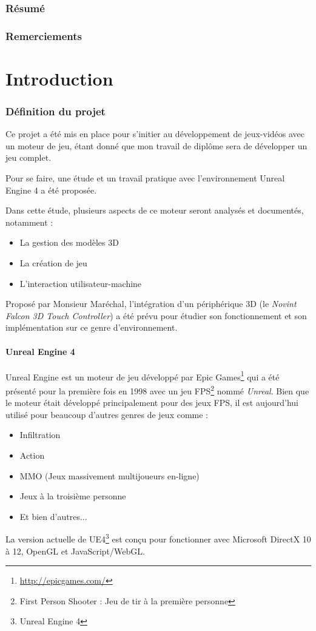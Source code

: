 \documentclass[11pt, a4paper, oneside]{article}
\begin{document}
\section{Résumé}
\section{Remerciements}
\newpage
\tableofcontents
\newpage
\part{Introduction}
\section{Définition du projet}
Ce projet a été mis en place pour s'initier au développement de jeux-vidéos avec un moteur de jeu, étant donné que mon travail de diplôme sera de développer un jeu complet.

Pour se faire, une étude et un travail pratique avec l'environnement Unreal Engine 4 a été proposée.

Dans cette étude, plusieurs aspects de ce moteur seront analysés et documentés, notamment :
\begin{itemize}
\item La gestion des modèles 3D
\item La création de jeu
\item L'interaction utilisateur-machine\\
\end{itemize}
Proposé par Monsieur Maréchal, l'intégration d'un périphérique 3D (le \textit{Novint Falcon 3D Touch Controller}) a été prévu pour étudier son fonctionnement et son implémentation sur ce genre d'environnement.
\subsection{Unreal Engine 4}
\label{sec:ue4definition}
Unreal Engine est un moteur de jeu développé par Epic Games\footnote{\url{http://epicgames.com/}} qui a été présenté pour la première fois en 1998 avec un jeu FPS\footnote{First Person Shooter : Jeu de tir à la première personne} nommé \textit{Unreal}. Bien que le moteur était développé principalement pour des jeux FPS, il est aujourd'hui utilisé pour beaucoup d'autres genres de jeux comme :
\begin{itemize}
\item Infiltration
\item Action
\item MMO (Jeux massivement multijoueurs en-ligne)
\item Jeux à la troisième personne
\item Et bien d'autres...
\end{itemize}
La version actuelle de UE4\footnote{Unreal Engine 4} est conçu pour fonctionner avec Microsoft DirectX 10 à 12, OpenGL et JavaScript/WebGL.
\newpage
\end{document}
